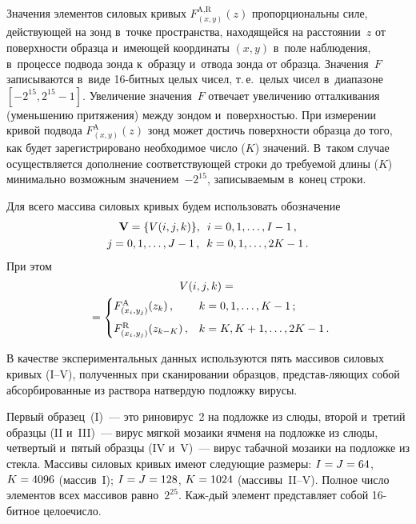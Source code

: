 \begin{multicols}{2}
Значения элементов силовых кривых $F^\text{A,R}_{(x,y)}(z)$ пропорциональны силе, 
действующей на зонд в~точке пространства, находящейся на расстоянии~$z$ 
от поверхности образца и~имеющей координаты $(x,y)$ в~поле наблюдения, в~процессе 
подвода зонда к~образцу и~отвода зонда от образца. Значения~$F$ записываются в~виде 16-бит\-ных 
целых чисел, т.\,е.\ целых чисел в~диапазоне $[-2^{15},2^{15}-1]$. Увеличение значения~$F$ 
отвечает увеличению отталкивания (уменьшению притяжения) между зондом и~поверхностью. 
При измерении кривой подвода $F^\text{A}_{(x,y)}(z)$ зонд может достичь поверхности 
образца до того, как будет зарегистрировано необходимое число ($K$) значений.
 В~таком случае осуществляется дополнение соответствующей строки до требуемой длины ($K$) 
 минимально возможным значением~$-2^{15}$, записываемым в~конец строки.

Для всего массива силовых кривых будем использовать обозначение 
\begin{multline*}
\mathbf{V}=\{V(i,j,k)\},\enskip i\hm= 0,1,\dots,I-1\,,\\
j=0,1,\dots,J-1\,,\enskip
 k=0,1,\dots,2K-1\,. 
 \end{multline*}
При этом
\begin{multline*}
V(i,j,k) ={}\\
{}= \begin{cases}
F^\text{A}_{(x_i,y_j)}(z_k)\,,        & k=0,1,\ldots,K-1\,; \\[6pt] 
F^\text{R}_{(x_i,y_j)}(z_{k-K})\,, & k=K,K+1,\ldots,2K-1\,.\hspace*{-3pt} 
\end{cases}
\end{multline*}

В качестве экспериментальных данных используются пять массивов силовых кривых (I--V), 
полученных при сканировании образцов, пред\-став-ляющих собой абсорбированные из раствора 
на\linebreak твердую подложку вирусы. 

Первый образец~(I)~--- это риновирус~2 на подложке из слюды, 
второй и~третий образцы (II и~III)~--- вирус мягкой мозаики ячменя на подложке из слюды, 
четвертый и~пятый образцы (IV и~V)~--- вирус табачной мозаики на подложке из стекла. 
Массивы силовых кривых имеют сле\-ду\-ющие размеры: $I\hm=J\hm=64$, $K\hm=4096$ (массив~I);\linebreak  
$I\hm=J\hm=128$, $K\hm=1024$ (массивы~II--V). Полное число элементов всех массивов равно~$2^{25}$. 
Каж-\linebreak дый элемент представляет собой 16-бит\-ное целое\linebreak число.
{ %

}
\end{multicols}
